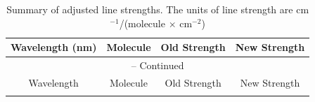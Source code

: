 \newpage
   \begin{longtable}{|cccc|}
      \caption{Summary of adjusted line strengths. The units of line
        strength are cm$^{-1}$/(molecule $\times$ cm$^{-2}$)} \\
        \hline
        Wavelength (nm) & Molecule & Old Strength & New Strength \\ \hline \hline
        \endfirsthead

        \multicolumn{4}{c}{{\tablename} \thetable{} -- Continued} \\
        \hline
        Wavelength & Molecule & Old Strength & New Strength \\ \hline \hline
        \endhead

        \hline
        \endfoot

        \hline
        \endlastfoot


\end{longtable}
